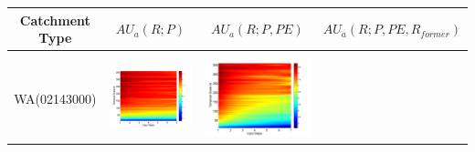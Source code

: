 \documentclass[review]{elsarticle}
\begin{document}
\begin{table}[H] \small
\label{table:AAU}
\centering
\begin{tabular}{cccc}
\hline 
\textbf{Catchment Type}&\textbf{$AU_a(R;P)$}&\textbf{$AU_a(R;P,PE)$}&\textbf{$AU_a(R;P,PE,R_{former})$}\\
\hline
\\
WA(02143000)
&\begin{minipage}{.3\textwidth}\includegraphics[width=\linewidth]{resultgraph/02143000p_abs.png}\end{minipage}
&\begin{minipage}{.3\textwidth}\includegraphics[width=\linewidth]{resultgraph/02143000pep_abs.png}\end{minipage}

\end{tabular}
\end{table}
\end{document}

